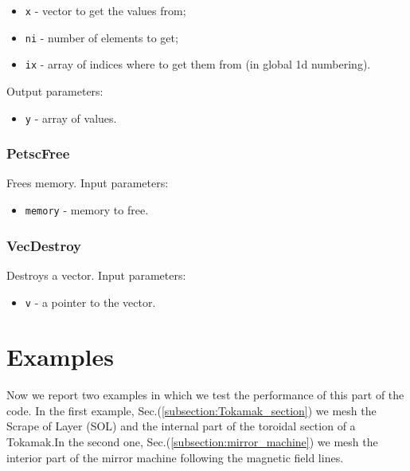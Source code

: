\begin{itemize}
\item \verb|x| - vector to get the values from;
\item \verb|ni| - number of elements to get;
\item \verb|ix| - array of indices where to get them from (in global 1d numbering).
\end{itemize}

Output parameters:

\begin{itemize}
\item \verb|y| - array of values.
\end{itemize}

\subsubsection{PetscFree}\label{subsubsection:PetscFree}
Frees memory. Input parameters:

\begin{itemize}
\item \verb|memory| - memory to free.
\end{itemize}

\subsubsection{VecDestroy}\label{subsubsection:VecDestroy}
Destroys a vector. Input parameters:

\begin{itemize}
\item \verb|v| - a pointer to the vector.
\end{itemize}

\section{Examples}\label{section:mesh_ex}
Now we report two examples in which we test the performance of this part of the code. In the first example, Sec.(\ref{subsection:Tokamak_section}) we mesh the Scrape of Layer (SOL) and the internal part of the toroidal section of a Tokamak.In the second one, Sec.(\ref{subsection:mirror_machine}) we mesh the interior part of the mirror machine following the magnetic field lines.

